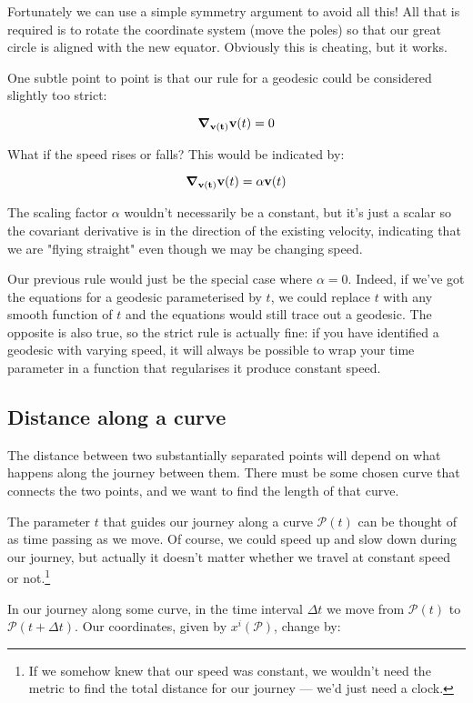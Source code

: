 Fortunately we can use a simple symmetry argument to avoid all this! All that is required is to rotate the coordinate system (move the poles) so that our great circle is aligned with the new equator. Obviously this is cheating, but it works.

One subtle point to point is that our rule for a geodesic could be considered slightly too strict:

$$
\grad_{\mathbf{v(t)}} \mathbf{v}(t) = 0
$$

What if the speed rises or falls? This would be indicated by:

$$
\grad_{\mathbf{v(t)}} \mathbf{v}(t) = \alpha \mathbf{v}(t)
$$

The scaling factor $\alpha$ wouldn't necessarily be a constant, but it's just a scalar so the covariant derivative is in the direction of the existing velocity, indicating that we are "flying straight" even though we may be changing speed.

Our previous rule would just be the special case where $\alpha = 0$. Indeed, if we've got the equations for a geodesic parameterised by $t$, we could replace $t$ with any smooth function of $t$ and the equations would still trace out a geodesic. The opposite is also true, so the strict rule is actually fine: if you have identified a geodesic with varying speed, it will always be possible to wrap your time parameter in a function that regularises it produce constant speed.

\subsection{Distance along a curve}

The distance between two substantially separated points will depend on what happens along the journey between them. There must be some chosen curve that connects the two points, and we want to find the length of that curve.

The parameter $t$ that guides our journey along a curve $\mathcal{P}(t)$ can be thought of as time passing as we move. Of course, we could speed up and slow down during our journey, but actually it doesn't matter whether we travel at constant speed or not.\footnote{If we somehow knew that our speed was constant, we wouldn't need the metric to find the total distance for our journey --- we'd just need a clock.}

In our journey along some curve, in the time interval $\Delta t$ we move from $\mathcal{P}(t)$ to $\mathcal{P}(t + \Delta t)$. Our coordinates, given by $x^i(\mathcal{P})$, change by:

